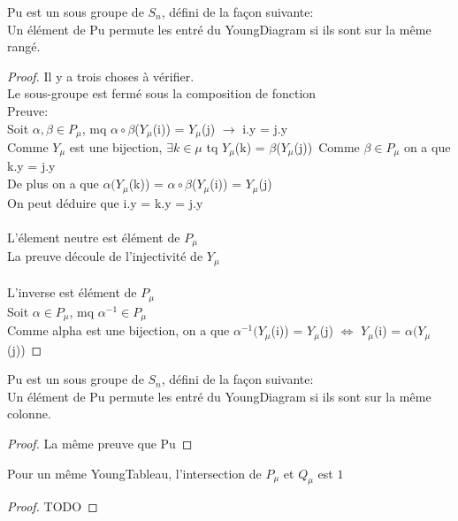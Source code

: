 \begin{definition}[Pu]
    \label{Pu}
    \leanok
    Pu est un sous groupe de $S_{n}$, défini de la façon suivante:\\
    Un élément de Pu permute les entré du YoungDiagram si ils sont sur la même rangé.
\end{definition}
\begin{proof}
    \leanok
    Il y a trois choses à vérifier.\\
    Le sous-groupe est fermé sous la composition de fonction\\
    Preuve:\\
    Soit $\alpha, \beta \in P_{\mu}$, mq $\alpha \circ \beta$($Y_{\mu}$(i)) = $Y_{\mu}$(j) $\to$ i.y = j.y\\
    Comme $Y_{\mu}$ est une bijection, $\exists k \in \mu$ tq $Y_{\mu}$(k) = $\beta$($Y_{\mu}$(j))\
    Comme $\beta \in P_{\mu}$ on a que k.y = j.y\\
    De plus on a que $\alpha (Y_{\mu}$(k)) = $\alpha \circ \beta$($Y_{\mu}$(i)) = $Y_{\mu}$(j)\\
    On peut déduire que i.y = k.y = j.y\\
    \\
    L'élement neutre est élément de $P_{\mu}$\\
    La preuve découle de l'injectivité de $Y_{\mu}$\\
    \\
    L'inverse est élément de $P_{\mu}$\\
    Soit $\alpha \in P_{\mu}$, mq $\alpha^{-1} \in P_{\mu}$\\
    Comme alpha est une bijection, on a que $\alpha^{-1} (Y_{\mu}$(i)) = $Y_{\mu}$(j) $\Leftrightarrow$ $Y_{\mu}$(i) = $\alpha (Y_{\mu}$(j))
\end{proof}

\begin{definition}[Qu]
    \label{Qu}
    \leanok
    Pu est un sous groupe de $S_{n}$, défini de la façon suivante:\\
    Un élément de Pu permute les entré du YoungDiagram si ils sont sur la même colonne.
\end{definition}
\begin{proof}
    \leanok
    La même preuve que Pu
\end{proof}

\begin{lemma}[sectPuQu]
    \label{sectPuQu}
    Pour un même YoungTableau, l'intersection de $P_{\mu}$ et $Q_{\mu}$ est ${1}$
\end{lemma}
\begin{proof}
    TODO
\end{proof}